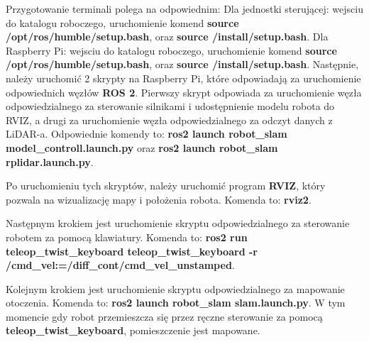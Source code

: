 \documentclass[a4paper,twoside,12pt]{book}
\begin{document}
\newpage
Przygotowanie terminali polega na odpowiednim:
Dla jednostki sterującej: wejsciu do katalogu roboczego, uruchomienie komend \textbf{source /opt/ros/humble/setup.bash}, oraz \textbf{source /install/setup.bash}.
\newline\newline
Dla Raspberry Pi: wejsciu do katalogu roboczego, uruchomienie komend \textbf{source /opt/ros/humble/setup.bash}, oraz \textbf{source /install/setup.bash}.
\newline\newline
Następnie, należy uruchomić 2 skrypty na Raspberry Pi, które odpowiadają za uruchomienie odpowiednich węzłów \textbf{ROS 2}. Pierwszy skrypt odpowiada za uruchomienie węzła odpowiedzialnego za sterowanie silnikami i udostępnienie modelu robota do RVIZ, a drugi za uruchomienie węzła odpowiedzialnego za odczyt danych z LiDAR-a. Odpowiednie komendy to: \textbf{ros2 launch robot\_slam model\_controll.launch.py} oraz \textbf{ros2 launch robot\_slam rplidar.launch.py}.
\newline\newline


Po uruchomieniu tych skryptów, należy uruchomić program \textbf{RVIZ}, który pozwala na wizualizację 
mapy i położenia robota. Komenda to: \textbf{rviz2}. 

Następnym krokiem jest uruchomienie skryptu odpowiedzialnego za sterowanie robotem za pomocą 
klawiatury. Komenda to: \textbf{ros2 run teleop\_twist\_keyboard teleop\_twist\_keyboard 
-r /cmd\_vel:=/diff\_cont/cmd\_vel\_unstamped}. 




\newpage
Kolejnym krokiem jest uruchomienie skryptu odpowiedzialnego za mapowanie otoczenia. Komenda to: \textbf{ros2 launch robot\_slam slam.launch.py}. W tym momencie gdy robot przemieszcza się przez ręczne sterowanie za pomocą \textbf{teleop\_twist\_keyboard}, pomieszczenie jest mapowane.
\end{document}
